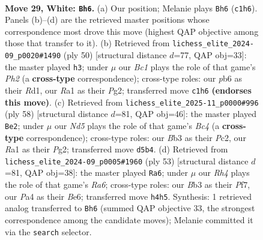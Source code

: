\documentclass[11pt]{article}
\begin{document}
\clearpage

\begin{figure}[p]\centering
\begin{subfigure}{0.46\textwidth}\centering
\resizebox{\linewidth}{!}{%
\newchessgame
\chessboard[
  setfen={r2k1r1b/2pb4/pp1n4/3Npp2/P6R/1B3N2/1P2KPP1/R1B5 w - - 0 29},
  showmover=false,
  pgfstyle=straightmove, color=movearrow, markmove={c1-h6}
]}
\caption{}
\end{subfigure}\hfill
\begin{subfigure}{0.46\textwidth}\centering
\resizebox{\linewidth}{!}{%
\newchessgame
\chessboard[
  setfen={5br1/1pr1k3/p3p1p1/4p1Np/2b5/2P5/P4PPP/1RBR2K1 w - - 0 26},
  showmover=false,
  pgfstyle=straightmove, color=movearrow, markmove={h2-h3}
]}
\caption{}
\end{subfigure}
\\[4pt]
\begin{subfigure}{0.46\textwidth}\centering
\resizebox{\linewidth}{!}{%
\newchessgame
\chessboard[
  setfen={r2n4/r2bk1pp/p1p2p2/P3p3/1NB5/1R2P3/1PP3PP/3R2K1 w - - 10 30},
  showmover=false,
  pgfstyle=straightmove, color=movearrow, markmove={c4-e2}
]}
\caption{}
\end{subfigure}\hfill
\begin{subfigure}{0.46\textwidth}\centering
\resizebox{\linewidth}{!}{%
\newchessgame
\chessboard[
  setfen={8/4kpp1/1p2b2p/1R1p4/2nN4/r1r1P3/P4PPP/1B2R1K1 b - - 3 27},
  showmover=false,
  pgfstyle=straightmove, color=movearrow, markmove={a3-a6}
]}
\caption{}
\end{subfigure}
\caption{\textbf{Move 29, White: \texttt{Bh6}.} (a) Our position; Melanie plays \texttt{Bh6} (\texttt{c1h6}). Panels (b)--(d) are the retrieved master positions whose correspondence most drove this move (highest QAP objective among those that transfer to it). (b) Retrieved from \texttt{lichess\_elite\_2024-09\_p0020\#1490} (ply 50) [structural distance $d$=77, QAP obj=33]: the master played \texttt{h3}; under $\mu$ our \emph{Bc1} plays the role of that game's \emph{Ph2} (a \textbf{cross-type} correspondence); cross-type roles: our \emph{p}b6 as their \emph{R}d1, our \emph{R}a1 as their \emph{P}g2; transferred move \texttt{c1h6} \textbf{(endorses this move)}. (c) Retrieved from \texttt{lichess\_elite\_2025-11\_p0000\#996} (ply 58) [structural distance $d$=81, QAP obj=46]: the master played \texttt{Be2}; under $\mu$ our \emph{Nd5} plays the role of that game's \emph{Bc4} (a \textbf{cross-type} correspondence); cross-type roles: our \emph{B}b3 as their \emph{P}c2, our \emph{R}a1 as their \emph{P}g2; transferred move \texttt{d5b4}. (d) Retrieved from \texttt{lichess\_elite\_2024-09\_p0005\#1960} (ply 53) [structural distance $d$=81, QAP obj=38]: the master played \texttt{Ra6}; under $\mu$ our \emph{Rh4} plays the role of that game's \emph{Ra6}; cross-type roles: our \emph{B}b3 as their \emph{P}f7, our \emph{P}a4 as their \emph{B}e6; transferred move \texttt{h4h5}. Synthesis: 1 retrieved analog transferred to \texttt{Bh6} (summed QAP objective 33, the strongest correspondence among the candidate moves); Melanie committed it via the \texttt{search} selector.}
\label{fig:thought-m56}
\end{figure}
\end{document}

